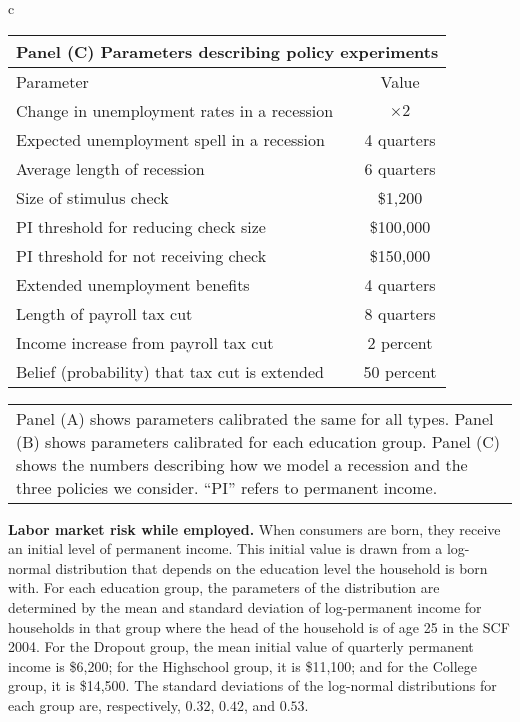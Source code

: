\documentclass[\econtexRoot/HAFiscal]{subfiles}
\begin{document}
{\begin{table}[p]
\begin{tabular}{c}
        \begin{tabular}{lc}
          \toprule 
          \multicolumn{2}{l}{Panel (C) Parameters describing policy experiments} \\ \midrule 
          Parameter & Value \\ \midrule 
          Change in unemployment rates in a recession & $\times 2$ \\ 
          Expected unemployment spell in a recession & 4 quarters \\ 
          Average length of recession & 6 quarters \\ 
          Size of stimulus check & \$1,200 \\ 
          PI threshold for reducing check size & \$100,000 \\ 
          PI threshold for not receiving check & \$150,000 \\ 
          Extended unemployment benefits & 4 quarters \\
          Length of payroll tax cut & 8 quarters \\ 
          Income increase from payroll tax cut & 2 percent \\ 
          Belief (probability) that tax cut is extended & 50 percent 		
          \\ \bottomrule
        \end{tabular} 

      \end{tabular}
    \begin{tabular}{p{16cm}}
      \medskip
      \small Panel (A) shows parameters calibrated the same for all types. Panel (B) shows parameters calibrated for each education group. Panel (C) shows the numbers describing how we model a recession and the three policies we consider. ``PI'' refers to permanent income.
      \end{tabular}
    \notinsubfile{\label{tab:calibration}}
  \end{table}
  \clearpage
}

\textbf{Labor market risk while employed.} When consumers are born, they receive an initial level of permanent income.
This initial value is drawn from a log-normal distribution that depends on the education level the household is born with.
For each education group, the parameters of the distribution are determined by the mean and standard deviation of log-permanent income for households in that group where the head of the household is of age 25 in the SCF 2004.
For the Dropout group, the mean initial value of quarterly permanent income is \$6,200; for the Highschool group, it is \$11,100; and for the College group, it is \$14,500.
The standard deviations of the log-normal distributions for each group are, respectively, $0.32$, $0.42$, and $0.53$.
\end{document}
